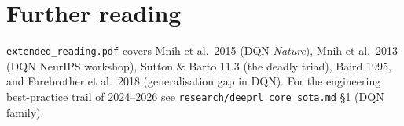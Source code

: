 \documentclass[11pt,oneside]{scrbook}
\begin{document}
\chapter{Further reading}

\texttt{extended\_reading.pdf} covers Mnih et al.\ 2015 (DQN \emph{Nature}), Mnih et al.\
2013 (DQN NeurIPS workshop), Sutton \& Barto 11.3 (the deadly triad), Baird 1995, and
Farebrother et al.\ 2018 (generalisation gap in DQN). For the engineering best-practice
trail of 2024--2026 see \texttt{research/deeprl\_core\_sota.md} \S1 (DQN family).
\end{document}
